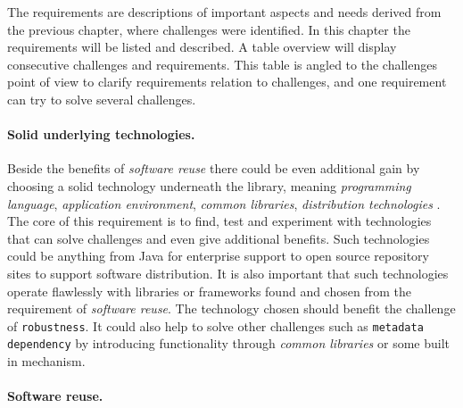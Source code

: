 

The requirements are descriptions of important aspects and needs derived from the previous chapter, 
 where challenges were identified.
In this chapter the requirements will be listed and described. A table overview will display
consecutive challenges and requirements. 
This table is angled to the challenges point of view to clarify requirements relation to challenges,
and one requirement can try to solve several challenges.

\paragraph{Solid underlying technologies.}

Beside the benefits of \emph{software reuse} there could be even additional gain by choosing
a solid technology underneath the library, meaning \emph{programming language},
\emph{application environment}, \emph{common libraries}, \emph{distribution technologies} \etc.
The core of this requirement is to find, test and experiment with technologies that can solve
challenges and even give additional benefits.
Such technologies could be anything from Java for enterprise support to open source repository
sites to support software distribution.
It is also important that such technologies operate flawlessly with libraries or frameworks
found and chosen from the requirement of \emph{software reuse}.
The technology chosen should benefit the challenge of \texttt{robustness}.
It could also help to solve other challenges such as \texttt{metadata dependency} by introducing
functionality through \emph{common libraries} or some built in mechanism.

\paragraph{Software reuse.}


